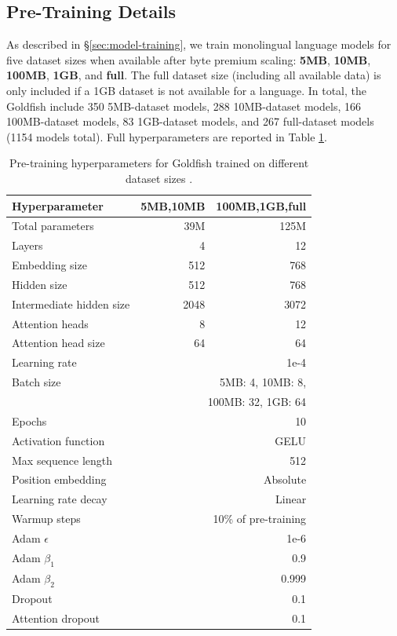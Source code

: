 \documentclass[11pt]{article}
\begin{document}
\subsection{Pre-Training Details}
\label{app:pretraining-details}
As described in \S\ref{sec:model-training}, we train monolingual language models for five dataset sizes when available after byte premium scaling: \textbf{5MB}, \textbf{10MB}, \textbf{100MB}, \textbf{1GB}, and \textbf{full}.
The full dataset size (including all available data) is only included if a 1GB dataset is not available for a language.
In total, the Goldfish include 350 5MB-dataset models, 288 10MB-dataset models, 166 100MB-dataset models, 83 1GB-dataset models, and 267 full-dataset models (1154 models total).
Full hyperparameters are reported in Table \ref{tab:hyperparameters}.

\setlength\tabcolsep{3pt}
\begin{table}[t]
    \centering
    \small
    \renewcommand{\arraystretch}{1.11}
    \begin{tabular}{|>{\raggedright}p{3.2cm}|r|r|}
    \hline
    \textbf{Hyperparameter} & \textbf{5MB,10MB} & \textbf{100MB,1GB,full} \\
    \hline
    Total parameters & 39M & 125M \\
    Layers & 4 & 12 \\
    Embedding size & 512 & 768 \\
    Hidden size & 512 & 768 \\
    Intermediate hidden size & 2048 & 3072 \\
    Attention heads & 8 & 12 \\
    Attention head size & 64 & 64 \\
    \hline
    Learning rate & \multicolumn{2}{r|}{1e-4} \\
    Batch size & \multicolumn{2}{r|}{5MB: 4, 10MB: 8,} \\
    & \multicolumn{2}{r|}{100MB: 32, 1GB: 64} \\
    Epochs & \multicolumn{2}{r|}{10} \\
    Activation function & \multicolumn{2}{r|}{GELU} \\
    Max sequence length & \multicolumn{2}{r|}{512} \\
    Position embedding & \multicolumn{2}{r|}{Absolute} \\
    Learning rate decay & \multicolumn{2}{r|}{Linear} \\
    Warmup steps & \multicolumn{2}{r|}{10\% of pre-training} \\
    Adam $\epsilon$ & \multicolumn{2}{r|}{1e-6} \\
    Adam $\beta_1$ & \multicolumn{2}{r|}{0.9} \\
    Adam $\beta_2$ & \multicolumn{2}{r|}{0.999} \\
    Dropout & \multicolumn{2}{r|}{0.1} \\
    Attention dropout & \multicolumn{2}{r|}{0.1} \\
    \hline
    \end{tabular}
    \caption{Pre-training hyperparameters for Goldfish trained on different dataset sizes \citep{devlin-etal-2019-bert,turc2019well,radford-etal-2018-improving}.}
    \label{tab:hyperparameters}
\end{table}
\end{document}
